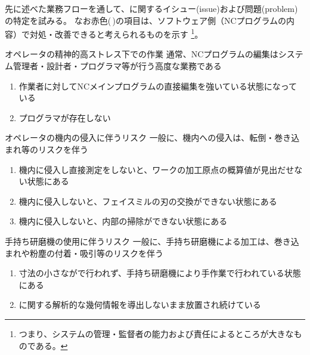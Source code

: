 

先に述べた業務フローを通して、\MMC に関するイシュー(issue)および問題(problem)の特定を試みる。
なお{\color{red}赤色}(\,\sarrow[red]\!)の項目は、ソフトウェア側（NCプログラムの内容）で対処・改善できると考えられるものを示す
\footnote{つまり、システムの管理・監督者の能力および責任によるところが大きなものである。}。




\begin{Issues}{オペレータの精神的高ストレス下での作業}
通常、NCプログラムの編集はシステム管理者・設計者・プログラマ等が行う高度な業務である
\begin{enumerate}[label=\sarrow]
\item[{\sarrow[red]}]作業者に対してNCメインプログラムの直接編集を強いている状態になっている
\item[{\sarrow[red]}]プログラマが存在しない
\end{enumerate}
\end{Issues}

\begin{Issues}{オペレータの機内の侵入に伴うリスク}
一般に、機内への侵入は、転倒・巻き込まれ等のリスクを伴う
\begin{enumerate}[label=\sarrow]
\item[{\sarrow[red]}]機内に侵入し直接測定をしないと、ワークの加工原点の概算値が見出だせない状態にある
\item[{\sarrow[red]}]機内に侵入しないと、フェイスミルの刃の交換ができない状態にある
\item 機内に侵入しないと、内部の掃除ができない状態にある
\end{enumerate}
\end{Issues}

\begin{Issues}{手持ち研磨機の使用に伴うリスク}
一般に、手持ち研磨機による加工は、巻き込まれや粉塵の付着・吸引等のリスクを伴う
\begin{enumerate}[label=\sarrow]
\item[{\sarrow[red]}]寸法の小さな\EndFaceChamferMilling が\MMC で行われず、手持ち研磨機により手作業で行われている状態にある
\item[{\sarrow[red]}]\EndFaceChamferMilling に関する解析的な幾何情報を導出しないまま放置され続けている
\end{enumerate}
\end{Issues}

